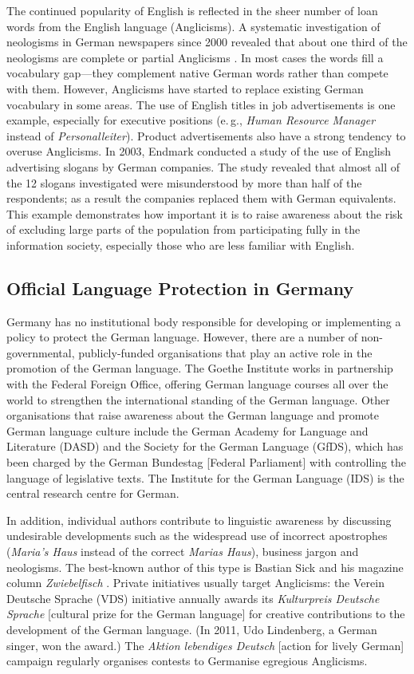 \documentclass[]{../../metanetpaper}
\begin{document}
\begin{multicols}{2}
The continued popularity of English is reflected in the sheer number of loan words from the English language (Anglicisms). A systematic investigation of neologisms in German newspapers since 2000 revealed that about one third of the neologisms are complete or partial Anglicisms \cite{Lemni1}. In most cases the words fill a vocabulary gap—they complement native German words rather than compete with them. However, Anglicisms have started to replace existing German vocabulary in some areas. The use of English titles in job advertisements is one example, especially for executive positions (e.\,g., \textit{Human Resource Manager} instead of \textit{Personalleiter}). Product advertisements also have a strong tendency to overuse Anglicisms. In 2003, Endmark conducted a study of the use of English advertising slogans by German companies. The study revealed that almost all of the 12 slogans investigated were misunderstood by more than half of the respondents; as a result the companies replaced them with German equivalents. This example demonstrates how important it is to raise awareness about the risk of excluding large parts of the population from participating fully in the information society, especially those who are less familiar with English.

\subsection{Official Language Protection in Germany}

Germany has no institutional body responsible for developing or implementing a policy to protect the German language. However, there are a number of non-governmental, publicly-funded organisations that play an active role in the promotion of the German language. The Goethe Institute works in partnership with the Federal Foreign Office, offering German language courses all over the world to strengthen the international standing of the German language. Other organisations that raise awareness about the German language and promote German language culture include the German Academy for Language and Literature (DASD) and the Society for the German Language (GfDS), which has been charged by the German Bundestag [Federal Parliament] with controlling the language of legislative texts. The Institute for the German Language (IDS) is the central research centre for German. 

In addition, individual authors contribute to linguistic awareness by discussing undesirable developments such as the widespread use of incorrect apostrophes (\textit{Maria’s Haus} instead of the correct \textit{Marias Haus}), business jargon and neologisms. The best-known author of this type is Bastian Sick \cite{Sick1} and his magazine column \textit{Zwiebelfisch} \cite{Sick2}. Private initiatives usually target Anglicisms: the Verein Deutsche Sprache (VDS) initiative annually awards its \textit{Kulturpreis Deutsche Sprache} [cultural prize for the German language] for creative contributions to the development of the German language. (In 2011, Udo Lindenberg, a German singer, won the award.) The \textit{Aktion lebendiges Deutsch} [action for lively German] campaign regularly organises contests to Germanise egregious Anglicisms.


\end{multicols}
\end{document}
